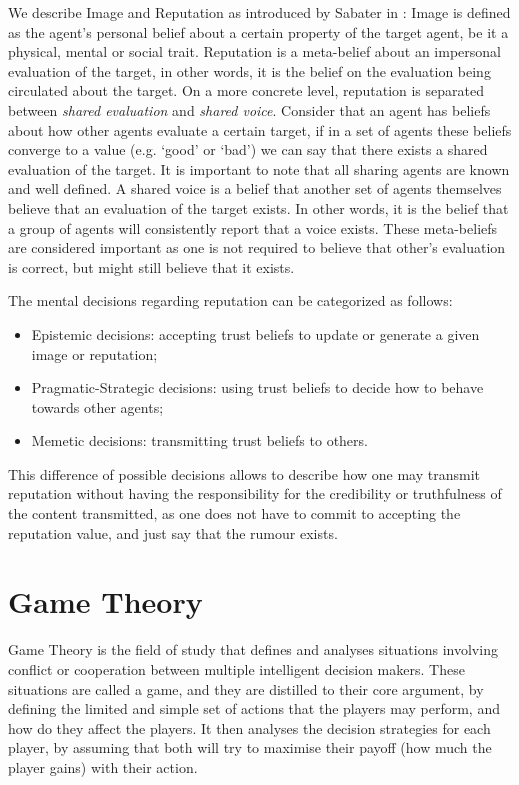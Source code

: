 We describe Image and Reputation as introduced by Sabater in \cite{Sabater2006}:
Image is defined as the agent's personal belief about a certain property of the target agent, be it a physical, mental or social trait. Reputation is a meta-belief about an impersonal evaluation of the target, in other words, it is the belief on the evaluation being circulated about the target. On a more concrete level, reputation is separated between \textit{shared evaluation} and \textit{shared voice}. Consider that an agent has beliefs about how other agents evaluate a certain target, if in a set of agents these beliefs converge to a value (e.g. `good' or `bad') we can say that there exists a shared evaluation of the target. It is important to note that all sharing agents are known and well defined. A shared voice is a belief that another set of agents themselves believe that an evaluation of the target exists. In other words, it is the belief that a group of agents will consistently report that a voice exists. These meta-beliefs are considered important as one is not required to believe that other's evaluation is correct, but might still believe that it exists.

The mental decisions regarding reputation can be categorized as follows:
\begin{itemize}
    \item Epistemic decisions: accepting trust beliefs to update or generate a given image or reputation;
    \item Pragmatic-Strategic decisions: using trust beliefs to decide how to behave towards other agents;
    \item Memetic decisions: transmitting trust beliefs to others. 
\end{itemize}
This difference of possible decisions allows to describe how one may transmit reputation without having the responsibility for the credibility or truthfulness of the content transmitted, as one does not have to commit to accepting the reputation value, and just say that the rumour exists.


\section{Game Theory}
\label{sec:GameTheory}
Game Theory is the field of study that defines and analyses situations involving conflict or cooperation between multiple intelligent decision makers. These situations are called a game, and they are distilled to their core argument, by defining the limited and simple set of actions that the players may perform, and how do they affect the players. It then analyses the decision strategies for each player, by assuming that both will try to maximise their payoff (how much the player gains) with their action.

